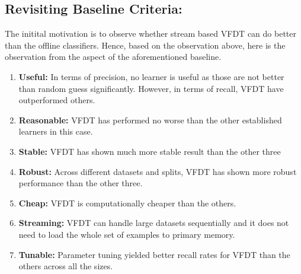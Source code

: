 \documentclass[sigplan]{acmart}\settopmatter{printfolios=true,printccs=false,printacmref=false}
\begin{document}
\subsection{Revisiting Baseline Criteria: }
The initital motivation is to observe whether stream based VFDT can do better than the offline classifiers. Hence, based on the observation above, here is the observation from the aspect of the aforementioned baseline.
\begin{enumerate}
	\item \textbf{Useful: } In terms of precision, no learner is useful as those are not better than random guess significantly. However, in terms of recall, VFDT have outperformed others.
	\item \textbf{Reasonable: } VFDT has performed no worse than the other established learners in this case.
	\item \textbf{Stable: } VFDT has shown much more stable result than the other three
	\item \textbf{Robust: } Across different datasets and splits, VFDT has shown more robust performance than the other three.
	\item \textbf{Cheap: } VFDT is computationally cheaper than the others.
	\item \textbf{Streaming: } VFDT can handle large datasets sequentially and it does not need to load the whole set of examples to primary memory.
	\item \textbf{Tunable: } Parameter tuning yielded better recall rates for VFDT than the others across all the sizes.
\end{enumerate}
\end{document}
